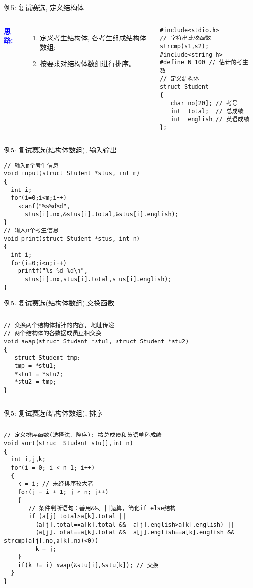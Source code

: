 \begin{frame}{例5: 复试赛选, 定义结构体}
\begin{columns}[T]
\textbf{\textcolor{blue}{思路:}}
\begin{enumerate}
	\item 定义考生结构体, 各考生组成结构体数组;
	\item 按要求对结构体数组进行排序。
\end{enumerate}
\begin{lstlisting}
#include<stdio.h>
// 字符串比较函数strcmp(s1,s2);
#include<string.h> 
#define N 100 // 估计的考生数
// 定义结构体
struct Student 
{ 
   char no[20]; // 考号
   int  total;  // 总成绩
   int  english;// 英语成绩
};
\end{lstlisting}
\end{columns}
\end{frame}

\begin{frame}{例5: 复试赛选(结构体数组), 输入输出}
\begin{lstlisting}
// 输入m个考生信息
void input(struct Student *stus, int m)
{
  int i;
  for(i=0;i<m;i++) 
    scanf("%s%d%d",
      stus[i].no,&stus[i].total,&stus[i].english); 
}
// 输入n个考生信息
void print(struct Student *stus, int n)
{
  int i;
  for(i=0;i<n;i++) 
    printf("%s %d %d\n",
      stus[i].no,stus[i].total,stus[i].english); 
}
\end{lstlisting}
\end{frame}

\begin{frame}{例5: 复试赛选(结构体数组),交换函数}
\begin{columns}[T]
\begin{lstlisting}
// 交换两个结构体指针的内容, 地址传递
// 两个结构体的各数据成员互相交换 
void swap(struct Student *stu1, struct Student *stu2)
{
   struct Student tmp;
   tmp = *stu1; 
   *stu1 = *stu2;
   *stu2 = tmp;
}

\end{lstlisting}
\end{columns}
\medskip
\end{frame}

\begin{frame}{例5: 复试赛选(结构体数组), 排序}
\begin{columns}[T]
\begin{lstlisting}
// 定义排序函数(选择法，降序): 按总成绩和英语单科成绩 
void sort(struct Student stu[],int n)            
{
  int i,j,k;
  for(i = 0; i < n-1; i++) 
  {
    k = i; // 未经排序较大者
    for(j = i + 1; j < n; j++)
    {
       // 条件判断语句：善用&&、||运算，简化if else结构
       if (a[j].total>a[k].total || 
         (a[j].total==a[k].total &&  a[j].english>a[k].english) || 
         (a[j].total==a[k].total &&  a[j].english==a[k].english && strcmp(a[j].no,a[k].no)<0))  
         k = j;
    }
    if(k != i) swap(&stu[i],&stu[k]); // 交换
  } 
}
\end{lstlisting}
\end{columns}
\medskip
\end{frame}

